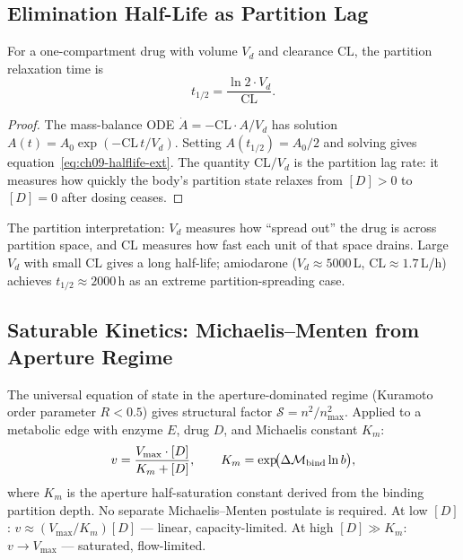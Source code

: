 \subsection{Elimination Half-Life as Partition Lag}
\label{subsec:ch09-halflife-ext}

\begin{corollary}
\label{cor:ch09-halflife-ext}
For a one-compartment drug with volume $V_d$ and clearance $\mathrm{CL}$,
the partition relaxation time is
\begin{equation}
  t_{1/2} = \frac{\ln 2 \cdot V_d}{\mathrm{CL}}.
  \label{eq:ch09-halflife-ext}
\end{equation}
\end{corollary}

\begin{proof}
The mass-balance ODE $\dot{A} = -\mathrm{CL}\cdot A/V_d$ has solution
$A(t) = A_0\exp(-\mathrm{CL}\,t/V_d)$.  Setting $A(t_{1/2}) = A_0/2$ and
solving gives equation~\eqref{eq:ch09-halflife-ext}.  The quantity
$\mathrm{CL}/V_d$ is the partition lag rate: it measures how quickly the
body's partition state relaxes from $[D]>0$ to $[D]=0$ after dosing ceases.
\end{proof}

The partition interpretation: $V_d$ measures how ``spread out'' the drug is
across partition space, and $\mathrm{CL}$ measures how fast each unit of that
space drains.  Large $V_d$ with small $\mathrm{CL}$ gives a long half-life;
amiodarone ($V_d \approx 5000$\,L, $\mathrm{CL} \approx 1.7$\,L/h) achieves
$t_{1/2} \approx 2000$\,h as an extreme partition-spreading case.

\subsection{Saturable Kinetics: Michaelis--Menten from Aperture Regime}
\label{subsec:ch09-MM}

The universal equation of state in the aperture-dominated regime (Kuramoto
order parameter $R < 0.5$) gives structural factor $\mathcal{S} = n^2/n_{\max}^2$.
Applied to a metabolic edge with enzyme $E$, drug $D$, and Michaelis constant
$K_m$:
\begin{equation}
  v = \frac{V_{\max}\cdot[D]}{K_m + [D]},
  \qquad K_m = \exp\!\bigl(\Delta\mathcal{M}_{\mathrm{bind}}\ln b\bigr),
  \label{eq:ch09-MM}
\end{equation}
where $K_m$ is the aperture half-saturation constant derived from the
binding partition depth.  No separate Michaelis--Menten postulate is required.
At low $[D]$: $v \approx (V_{\max}/K_m)[D]$ --- linear, capacity-limited.
At high $[D] \gg K_m$: $v \to V_{\max}$ --- saturated, flow-limited.

